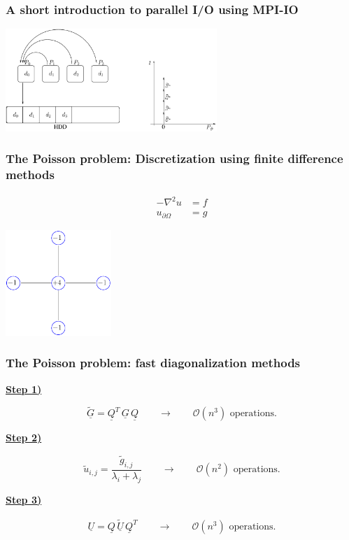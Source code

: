 \documentclass{beamer}
\begin{document}
\begin{frame}\frametitle{A short introduction to parallel I/O using MPI-IO}
  \begin{center}
    \includegraphics[width=8cm]{serial}
  \end{center}
\end{frame}

\begin{frame}\frametitle{The Poisson problem: Discretization using finite difference methods}
\[
  \begin{split}
    -\nabla^2 u &= f \\
    u_{\partial\Omega} &= g
  \end{split}
\]
\begin{center}
\includegraphics[width=4cm]{FivePointStencil}
\end{center}
\end{frame}
\begin{frame}\frametitle{The Poisson problem: fast diagonalization methods}
\underline{\textbf{Step 1)}}

\begin{equation}
  \underline{{\widetilde{G}}} = \underline{Q}^T \,\underline{G}\, \underline{Q} \qquad \longrightarrow \qquad \mathcal{O}(n^3) \text{ operations}.
\end{equation}

\underline{\textbf{Step 2)}}

\begin{equation}
  \widetilde{u}_{i,j} = \frac{\widetilde{g}_{i,j}}{\lambda_i + \lambda_j} \qquad \longrightarrow \qquad \mathcal{O}(n^2) \text{ operations}.
\end{equation}

\underline{\textbf{Step 3)}}

\begin{align}
  \underline{U} = \underline{Q} \,\underline{\widetilde{U}} \,\underline{Q}^T \qquad \longrightarrow \qquad \mathcal{O}(n^3) \text{ operations}. \\ \nonumber
\end{align}
\end{frame}
\end{document}
